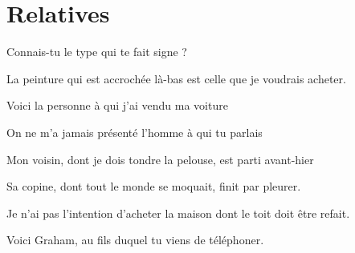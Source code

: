 \documentclass[a4paper,english,bookmarks]{article}
\begin{document}
\newboxans

\section{Relatives}

\noafter

\begin{enumerate}
    \begin{minipage}{0.48\linewidth}
	    \item Connais-tu le type qui te fait signe ?
	
	
	    \item La peinture qui est accrochée là-bas est celle que je voudrais acheter.
	
	
	    \item Voici la personne à qui j'ai vendu ma voiture
	
    	
    	\item On ne m'a jamais présenté l'homme à qui tu parlais
    	
    	
    	\item Mon voisin, dont je dois tondre la pelouse, est parti avant-hier
    	
    	
    	\item Sa copine, dont tout le monde se moquait, finit par pleurer.
    	
    	
    	\item Je n'ai pas l'intention d'acheter la maison dont le toit doit être refait.
    	
    	
    	\item Voici Graham, au fils duquel tu viens de téléphoner.
    	

\end{minipage}
\end{enumerate}
\end{document}
